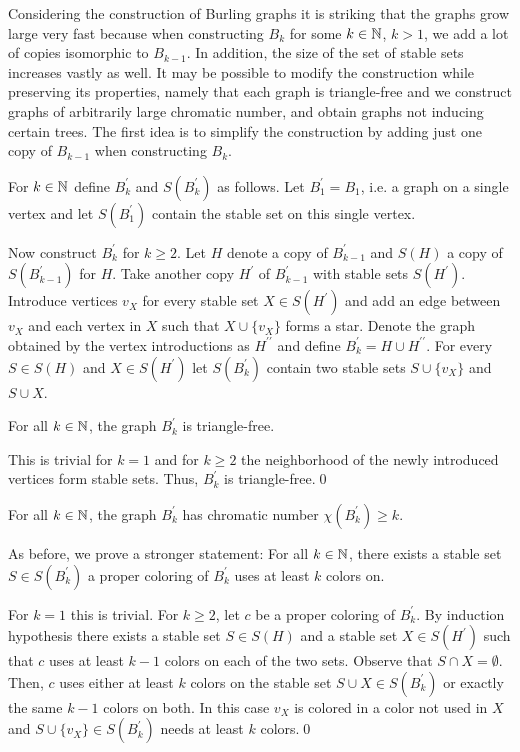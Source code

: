 Considering the construction of Burling graphs it is striking that the graphs grow large very fast because when constructing $B_k$ for some $k\in\mathbb{N}$, $k>1$, we add a lot of copies isomorphic to $B_{k-1}$. In addition, the size of the set of stable sets increases vastly as well. It may be possible to modify the construction while preserving its properties, namely that each graph is triangle-free and we construct graphs of arbitrarily large chromatic number, and obtain graphs not inducing certain trees. The first idea is to simplify the construction by adding just one copy of $B_{k-1}$ when constructing $B_k$.

For $k\in\mathbb{N}$ define $B^\prime_k$ and $S(B^\prime_k)$ as follows. Let $B_1^\prime =B_1$, i.e. a graph on a single vertex and let $S(B_1^\prime )$ contain the stable set on this single vertex.

Now construct $B^\prime_k$ for $k\geq 2$. Let $H$ denote a copy of $B_{k-1}^\prime$ and $S(H)$ a copy of $S(B_{k-1}^\prime )$ for $H$. Take another copy $H^\prime$ of $B_{k-1}^\prime$ with stable sets $S(H^\prime )$. Introduce vertices $v_X$ for every stable set $X\in S(H^\prime )$ and add an edge between $v_X$ and each vertex in $X$ such that $X\cup \{v_X\}$ forms a star. Denote the graph obtained by the vertex introductions as $H^{\prime\prime}$ and define $B_k^\prime =H\cup H^{\prime\prime}$. For every $S\in S(H)$ and $X\in S(H^\prime)$ let $S(B_k^\prime )$ contain two stable sets $S\cup\{v_X\}$ and $S\cup X$.

\begin{thm}
For all $k\in\mathbb{N}$, the graph $B_k^\prime$ is triangle-free.
\end{thm}
\begin{prf}
This is trivial for $k=1$ and for $k\geq 2$ the neighborhood of the newly introduced vertices form stable sets. Thus, $B_k^\prime$ is triangle-free.\qed
\end{prf}

\begin{thm}
For all $k\in\mathbb{N}$, the graph $B_k^\prime$ has chromatic number $\chi (B_k^\prime)\geq k$.
\end{thm}
\begin{prf}
As before, we prove a stronger statement: For all $k\in\mathbb{N}$, there exists a stable set $S\in S(B_k^\prime )$ a proper coloring of $B_k^\prime$ uses at least $k$ colors on.

For $k=1$ this is trivial. For $k\geq 2$, let $c$ be a proper coloring of $B_k^\prime$. By induction hypothesis there exists a stable set $S\in S(H)$ and a stable set $X\in S(H^\prime )$ such that $c$ uses at least $k-1$ colors on each of the two sets. Observe that $S\cap X=\emptyset$. Then, $c$ uses either at least $k$ colors on the stable set $S\cup X\in S(B_k^\prime)$ or exactly the same $k-1$ colors on both. In this case $v_X$ is colored in a color not used in $X$ and $S\cup \{v_X\}\in S(B_k^\prime)$ needs at least $k$ colors.\qed
\end{prf}

